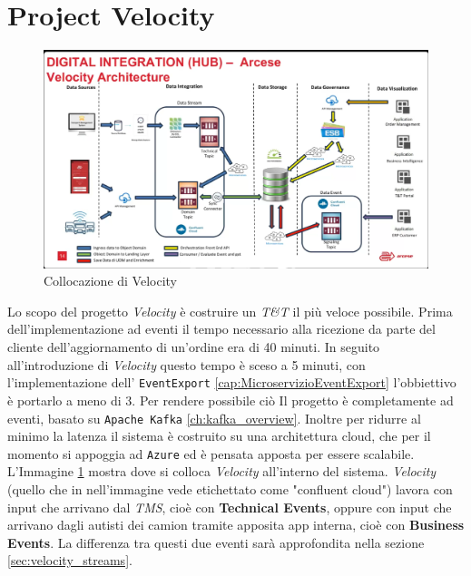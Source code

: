 \section{Project Velocity}
\label{sec:project_velocity}
\begin{figure}[htbp]
    \centering
    \includegraphics[width=\textwidth]{images/architecture/collocazione_velocity.png}
    \caption{Collocazione di Velocity}
    \label{fig:collocazione_velocity_img}
\end{figure}
Lo scopo del progetto \textit{Velocity} è costruire un \textit{T\&T} il più veloce possibile.
Prima dell'implementazione ad eventi il tempo necessario alla ricezione da parte del cliente dell'aggiornamento di un'ordine era di 40 minuti.
In seguito all'introduzione di \textit{Velocity} questo tempo è sceso a 5 minuti, con l'implementazione dell' \texttt{EventExport} \ref{cap:MicroservizioEventExport} l'obbiettivo è portarlo a meno di 3.
Per rendere possibile ciò Il progetto è completamente ad eventi, basato su \texttt{Apache Kafka} \ref{ch:kafka_overview}. 
Inoltre per ridurre al minimo la latenza il sistema è costruito su una architettura cloud, che per il momento si appoggia ad \texttt{Azure} ed è pensata apposta per essere scalabile.
L'Immagine \ref{fig:collocazione_velocity_img} mostra dove si colloca \textit{Velocity} all'interno del sistema.
\textit{Velocity} (quello che in nell'immagine vede etichettato come "confluent cloud") lavora con input che arrivano dal \textit{TMS}, cioè con \textbf{Technical Events},
oppure con input che arrivano dagli autisti dei camion tramite apposita app interna, cioè con \textbf{Business Events}.
La differenza tra questi due eventi sarà approfondita nella sezione \ref{sec:velocity_streams}.


